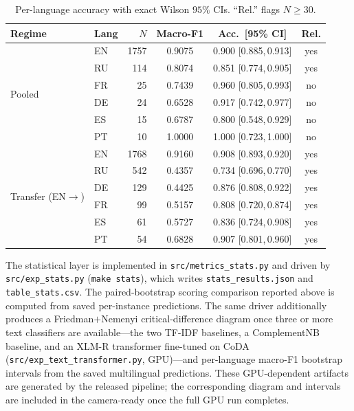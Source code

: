 \documentclass[11pt,a4paper]{article}
\begin{document}
\begin{table}[h]
\centering
\caption{Per-language accuracy with exact Wilson $95\%$ CIs. ``Rel.'' flags $N\geq30$.}
\label{tab:stats-ml}
\small
\begin{tabular}{@{}llrccc@{}}
\toprule
\textbf{Regime} & \textbf{Lang} & \textbf{$N$} & \textbf{Macro-F1} & \textbf{Acc.\ [95\% CI]} & \textbf{Rel.} \\
\midrule
\multirow{6}{*}{Pooled}
 & EN & 1757 & 0.9075 & 0.900 [0.885,\,0.913] & yes \\
 & RU &  114 & 0.8074 & 0.851 [0.774,\,0.905] & yes \\
 & FR &   25 & 0.7439 & 0.960 [0.805,\,0.993] & no \\
 & DE &   24 & 0.6528 & 0.917 [0.742,\,0.977] & no \\
 & ES &   15 & 0.6787 & 0.800 [0.548,\,0.929] & no \\
 & PT &   10 & 1.0000 & 1.000 [0.723,\,1.000] & no \\
\midrule
\multirow{6}{*}{Transfer (EN$\rightarrow$)}
 & EN & 1768 & 0.9160 & 0.908 [0.893,\,0.920] & yes \\
 & RU &  542 & 0.4357 & 0.734 [0.696,\,0.770] & yes \\
 & DE &  129 & 0.4425 & 0.876 [0.808,\,0.922] & yes \\
 & FR &   99 & 0.5157 & 0.808 [0.720,\,0.874] & yes \\
 & ES &   61 & 0.5727 & 0.836 [0.724,\,0.908] & yes \\
 & PT &   54 & 0.6828 & 0.907 [0.801,\,0.960] & yes \\
\bottomrule
\end{tabular}
\end{table}

The statistical layer is implemented in \texttt{src/metrics\_stats.py} and driven by
\texttt{src/exp\_stats.py} (\texttt{make stats}), which writes \texttt{stats\_results.json}
and \texttt{table\_stats.csv}. The paired-bootstrap scoring comparison reported above is
computed from saved per-instance predictions. The same driver additionally produces a
Friedman$+$Nemenyi critical-difference diagram once three or more text classifiers are
available---the two TF-IDF baselines, a ComplementNB baseline, and an XLM-R transformer
fine-tuned on CoDA (\texttt{src/exp\_text\_transformer.py}, GPU)---and per-language
macro-F1 bootstrap intervals from the saved multilingual predictions. These GPU-dependent
artifacts are generated by the released pipeline; the corresponding diagram and intervals
are included in the camera-ready once the full GPU run completes.
\end{document}

